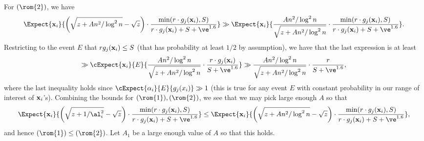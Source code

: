     For $(\rom{2})$, we have
    \[
    \Expect{{\bf x}_i}{\left(\sqrt{z+An^2/\log^2 n}-\sqrt{z}\right)\cdot \frac{\min(r\cdot g_j({\bf x}_i),S)}{r\cdot g_j({\bf x}_i)+S+\ve^{1.6}}}
    \gg
     \Expect{{\bf x}_i}{\frac{An^2/\log^2 n}{\sqrt{z+An^2/\log^2 n}}\cdot \frac{\min(r\cdot g_j({\bf x}_i),S)}{r\cdot g_j({\bf x}_i)+S+\ve^{1.6}}}.
    \]
    Restricting to the event $E$ that $r g_j({\bf x}_i)\leq S$ (that has probability at least $1/2$ by assumption), we have that the last expression
    is at least
    \[
    \gg\cExpect{{\bf x}_i}{E}{\frac{An^2/\log^2 n}{\sqrt{z+An^2/\log^2 n}}\cdot \frac{r\cdot g_j({\bf x}_i)}{S+\ve^{1.6}}}
    \gg \frac{An^2/\log^2 n}{\sqrt{z+An^2/\log^2 n}}\cdot \frac{r}{S+\ve^{1.6}},
    \]
    where the last inequality holds since $\cExpect{\alpha_i}{E}{g_j(x_i)}\gg 1$ (this is true for any event $E$ with constant probability
    in our range of interest of ${\bf x}_i$'s). Combining the bounds for $(\rom{1}),(\rom{2})$, we see that we may pick large enough $A$ so
    that
    \[
    \Expect{{\bf x}_i}{\left(\sqrt{z+1/\al_i^2} -\sqrt{z}\right)\cdot \frac{\min(r\cdot g_j({\bf x}_i),S)}
	{r\cdot g_j({\bf x}_i)+S+\ve^{1.6}}}
\leq \Expect{{\bf x}_i}{\left(\sqrt{z+An^2/\log^2 n}-\sqrt{z}\right)\cdot \frac{\min(r\cdot g_j({\bf x}_i),S)}{r\cdot g_j({\bf x}_i)+S+\ve^{1.6}}},
    \]
    and hence $(\rom{1})\leq (\rom{2})$. Let $A_1$ be a large enough value of $A$ so that this holds.

